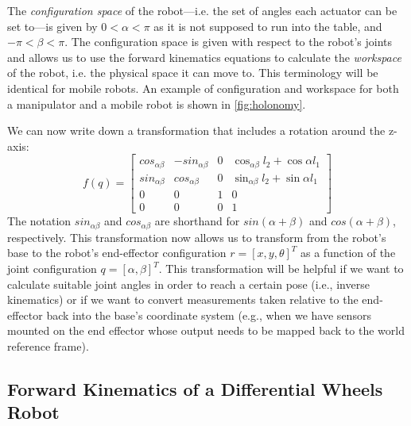 The \emph{configuration space} of the robot---i.e. the set of angles each actuator can be set to---is given by $ 0 < \alpha < \pi $ as it is not supposed to run into the table, and $ -\pi < \beta < \pi$.
The configuration space is given with respect to the robot's joints and allows us to use the forward kinematics equations to calculate the \emph{workspace} of the robot, i.e. the physical space it can move to.
This terminology will be identical for mobile robots. An example of configuration and workspace for both a manipulator and a mobile robot is shown in \cref{fig:holonomy}.

We can now write down  a transformation that includes a rotation around the z-axis:
\begin{equation}
\label{eq:2armtrans}
f(q) = \left[\begin{array}{cccc}cos_{\alpha\beta} & -sin_{\alpha\beta} &  0 & \cos_{\alpha\beta}l_2+\cos\alpha l_1\\
                        sin_{\alpha\beta} & cos_{\alpha\beta} & 0 & \sin_{\alpha\beta}l_2+\sin\alpha l_1\\
                                                0 & 0 & 1 & 0\\
                                                0 & 0 & 0 & 1\end{array}\right]
\end{equation}
The notation $sin_{\alpha\beta}$ and $cos_{\alpha\beta}$ are shorthand for $sin(\alpha+\beta)$ and $cos(\alpha+\beta)$, respectively.
%
This transformation now allows us to transform from the robot's base to the robot's end-effector configuration $r = [x, y, \theta]^T$ as a function of the joint configuration $q = [\alpha, \beta]^T$.
This transformation will be helpful if we want to calculate suitable joint angles in order to reach a certain pose (i.e., inverse kinematics) or if we want to convert measurements taken relative to the end-effector back into the base's coordinate system (e.g., when we have sensors mounted on the end effector whose output needs to be mapped back to the world reference frame).

\subsection{Forward Kinematics of a Differential Wheels Robot}\label{sec:kinematics:fwkmobile}

